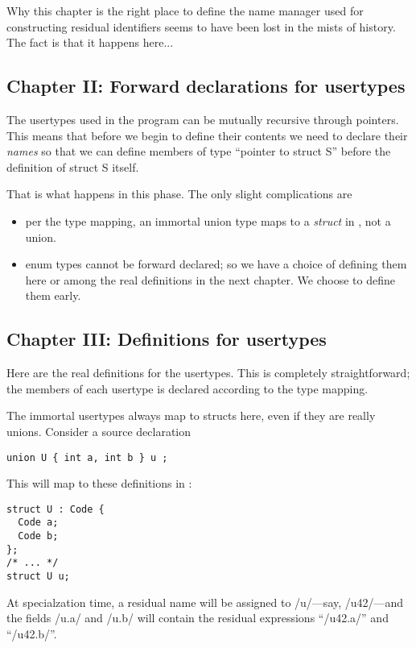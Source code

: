 \begin{docpart}
Why this chapter is the right place to define the name manager used
for constructing residual identifiers seems to have been lost in the
mists of history. The fact is that it happens here...

\subsection{Chapter II: Forward declarations for usertypes}
\label{sec:gegen:ForwardDeclarationsForUsertypes}
The usertypes used in the program can be mutually recursive through
pointers. This means that before we begin to define their contents we
need to declare their \emph{names} so that we can define members of
type ``pointer to struct S'' before the definition of struct S itself.

That is what happens in this phase. The only slight complications
are
\begin{itemize}
\item per the type mapping, an immortal union type maps to a
      \emph{struct} in \Pgen, not a union.
\item enum types cannot be forward declared; so we have a choice of
      defining them here or among the real definitions in the next
      chapter. We choose to define them early.
\end{itemize}

\subsection{Chapter III: Definitions for usertypes}
\label{sec:gegen:DefinitionsForUsertypes}
Here are the real definitions for the usertypes. This is completely
straightforward; the members of each usertype is declared according to
the type mapping.

The immortal usertypes always map to structs here, even if they are
really unions. Consider a source declaration
\begin{verbatim}
union U { int a, int b } u ;
\end{verbatim}
This will map to these definitions in \Pgen:
\begin{verbatim}
struct U : Code {
  Code a;
  Code b;
};
/* ... */
struct U u;
\end{verbatim}
At specialzation time, a residual name will be assigned to /u/---say,
/u42/---and the fields /u.a/ and /u.b/ will contain the residual
expressions ``/u42.a/'' and ``/u42.b/''.


\end{docpart}
